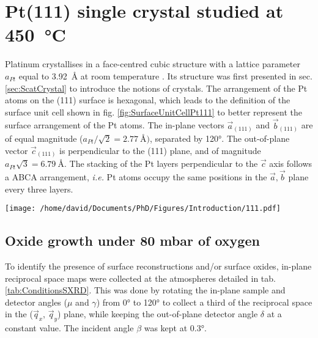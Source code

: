 \section{Pt(111) single crystal studied at \qty{450}{\degreeCelsius}} \label{sec:SXRD111}

Platinum crystallises in a face-centred cubic structure with a lattice parameter $a_{Pt}$ equal to \qty{3.92}{\angstrom} at room temperature \parencite{Waseda1975}.
Its structure was first presented in sec. \ref{sec:ScatCrystal} to introduce the notions of crystals.
The arrangement of the Pt atoms on the (111) surface is hexagonal, which leads to the definition of the surface unit cell shown in fig. \ref{fig:SurfaceUnitCellPt111} to better represent the surface arrangement of the Pt atoms.
The in-plane vectors $\vec{a}_{(111)}$ and $\vec{b}_{(111)}$ are of equal magnitude ($a_{Pt} / \sqrt{2} = \qty{2.77}{\angstrom})$, separated by \ang{120}.
The out-of-plane vector $\vec{c}_{(111)}$ is perpendicular to the (111) plane, and of magnitude $a_{Pt} \sqrt{3} = \qty{6.79}{\angstrom}$.
The stacking of the Pt layers perpendicular to the $\vec{c}$ axis follows a ABCA arrangement, \textit{i.e.} Pt atoms occupy the same positions in the $\vec{a}, \vec{b}$ plane every three layers.

\begin{SCfigure}
    \centering
    \texttt{[image: /home/david/Documents/PhD/Figures/Introduction/111.pdf]}
    \caption{
        Face-centred cubic unit cell of Pt with (111) crystallographic plane drawn in green.
        $\vec{a}_{(111)}$, $\vec{b}_{(111)}$ and $\vec{c}_{(111)}$ are the $(111)$ surface unit cell vectors.
        There are three \{111\} planes spanned by the magnitude of $\vec{c}_{(111)}$ (blue, red and green on the figure).
    }
    \label{fig:SurfaceUnitCellPt111}
\end{SCfigure}

\subsection{Oxide growth under 80 mbar of oxygen}

To identify the presence of surface reconstructions and/or surface oxides, in-plane reciprocal space maps were collected at the atmospheres detailed in tab. \ref{tab:ConditionsSXRD}.
This was done by rotating the in-plane sample and detector angles ($\mu$ and $\gamma$) from \ang{0} to \ang{120} to collect a third of the reciprocal space in the ($\vec{q}_x$, $\vec{q}_y$) plane, while keeping the out-of-plane detector angle $\delta$ at a constant value.
The incident angle $\beta$ was kept at \ang{0.3}.

